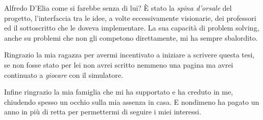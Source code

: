 Alfredo D'Elia come si farebbe senza di lui? È stato la \emph{spina d'orsale} del progetto, l'interfaccia tra le idee, a volte eccessivamente visionarie, dei professori ed il sottoscritto che le doveva implementare. La sua capacità di problem solving, anche su problemi che non gli competono direttamente, mi ha sempre sbalordito.

Ringrazio la mia ragazza per avermi incentivato a iniziare a scrivere questa tesi, se non fosse stato per lei non avrei scritto nemmeno una pagina ma avrei continuato a \emph{giocare} con il simulatore.

Infine ringrazio la mia famiglia che mi ha supportato e ha creduto in me, chiudendo spesso un occhio sulla mia assenza in casa. E nondimeno ha pagato un anno in più di retta per permettermi di seguire i miei interessi.











